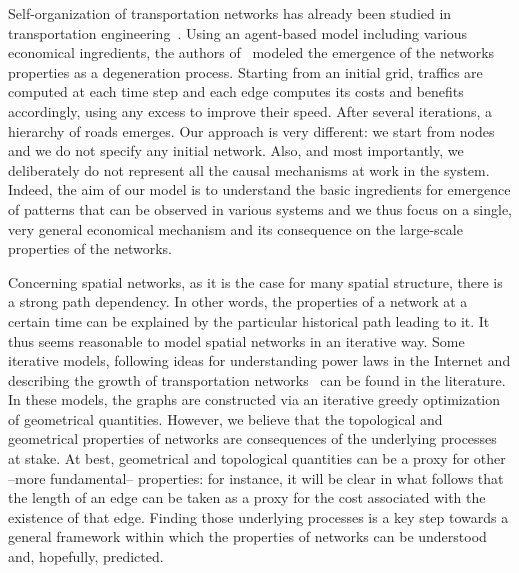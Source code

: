 Self-organization of transportation networks has already been studied in
transportation engineering~\cite{Levinson:2006, Xie:2009}. Using an agent-based
model including various economical ingredients, the authors
of~\cite{Levinson:2006} modeled the emergence of the networks properties as a
degeneration process. Starting from an initial grid, traffics are computed at
each time step and each edge computes its costs and benefits accordingly, using
any excess to improve their speed. After several iterations, a hierarchy of
roads emerges. Our approach is very different: we start from nodes and we do not
specify any initial network. Also, and most importantly, we deliberately do not
represent all the causal mechanisms at work in the system. Indeed, the aim of
our model is to understand the basic ingredients for emergence of patterns that
can be observed in various systems and we thus focus on a single, very general
economical mechanism and its consequence on the large-scale properties of the
networks.

Concerning spatial networks, as it is the case for many spatial structure, there
is a strong path dependency. In other words, the properties of a network at a
certain time can be explained by the particular historical path leading to it.
It thus seems reasonable to model spatial networks in an iterative way. Some
iterative models, following ideas for understanding power laws in the Internet
\cite{Fabrikant:2002} and describing the growth of transportation
networks~\cite{Gastner:2006} can be found in the literature. In these models,
the graphs are constructed via an iterative greedy optimization of geometrical
quantities. However, we believe that the topological and geometrical properties
of networks are consequences of the underlying processes at stake. At best,
geometrical and topological quantities can be a proxy for other --more
fundamental-- properties: for instance, it will be clear in what follows that
the length of an edge can be taken as a proxy for the cost associated with the
existence of that edge. Finding those underlying processes is a key step towards
a general framework within which the properties of networks can be understood
and, hopefully, predicted.\\

